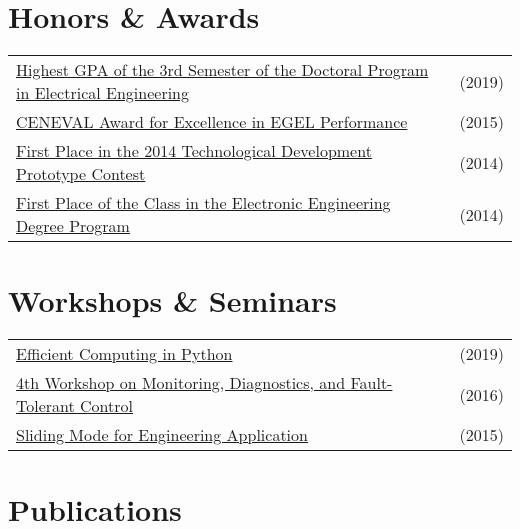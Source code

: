\documentclass[a4paper,10pt]{article}
\begin{document}
\section{Honors \& Awards}
\begin{tabularx}{\linewidth}{@{}l X@{}}	
\href{https://balcortex.github.io/assets/awards/highest_gpa_doctoral.pdf}{Highest GPA of the 3rd Semester of the Doctoral Program in Electrical Engineering} & \hfill (2019) \\
\href{https://balcortex.github.io/assets/awards/ceneval_excellence_award.pdf}{CENEVAL Award for Excellence in EGEL Performance} & \hfill (2015) \\
\href{https://balcortex.github.io/assets/awards/technological_development_contest_award.pdf}{First Place in the 2014 Technological Development Prototype Contest} & \hfill (2014) \\
\href{https://balcortex.github.io/assets/awards/highest_gpa_bachelors.pdf}{First Place of the Class in the Electronic Engineering Degree Program} & \hfill (2014) \\
\end{tabularx}


\section{Workshops \& Seminars}
\begin{tabularx}{\linewidth}{@{}l X@{}}	
\href{https://balcortex.github.io/assets/workshops/efficient_python_seminar.pdf}{Efficient Computing in Python} & \hfill (2019) \\
\href{https://balcortex.github.io/assets/workshops/fault_diagnosis_workshop.pdf}{4th Workshop on Monitoring, Diagnostics, and Fault-Tolerant Control} & \hfill (2016)\\
\href{https://balcortex.github.io/assets/workshops/sliding_mode_seminar.pdf}{Sliding Mode for Engineering Application} & \hfill (2015)\\
\end{tabularx}


\section{Publications}
\begin{refsection}
\nocite{*}
\printbibliography[heading=none]
\end{refsection}



\vfill
{}
\end{document}

